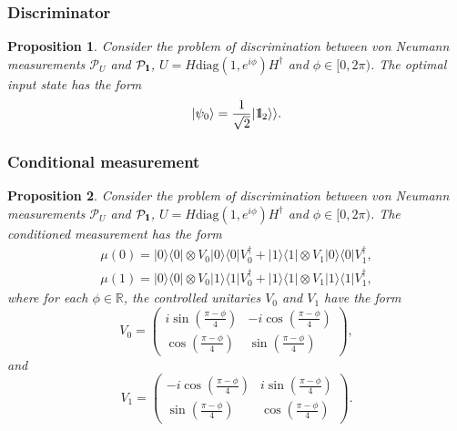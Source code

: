\documentclass[preprint,12pt, a4paper]{elsarticle}
\newcommand{\ket}[1]{\ensuremath{|#1\rangle}}
\newcommand{\bra}[1]{\ensuremath{\langle#1|}}
\newcommand{\ketbra}[2]{\ensuremath{\ket{#1}\bra{#2}}}
\newcommand{\proj}[1]{\ensuremath{\ketbra{#1}{#1}}}
\newcommand{\1}{{\rm 1\hspace{-0.9mm}l}}
\newcommand{\Id}{{\rm 1\hspace{-0.9mm}l}}
\newcommand{\PP}{\mathcal{P}}
\newcommand{\diag}{\mathrm{diag}}
\newtheorem{proposition}{Proposition}
\begin{document}
\subsubsection{Discriminator}\label{sec:example_discriminator}

\begin{proposition}\label{prop-discrim}
Consider the problem of discrimination between von Neumann measurements $\PP_U$ 
and $\PP_\1$, $U = H\diag(1, e^{i \phi}) H^\dagger $ and $\phi \in [0, 
2\pi)$.  The optimal input state has the form
\begin{equation}
\ket{\psi_{0}} = \frac{1}{\sqrt{2}} |\Id_2 \rangle \rangle.
\end{equation}
\end{proposition}



\subsubsection{Conditional measurement}\label{sec_example_final_measurement}


\begin{proposition}\label{prop:optimal-measurement}
	Consider the problem of discrimination between von Neumann measurements $\PP_U$ 
	and $\PP_\1$, $U = H\diag(1, e^{i \phi}) H^\dagger $ and $\phi \in [0, 
	2\pi)$.  
The  conditioned measurement has the form
\begin{equation}
\begin{split}
\mu(0) = \proj{0} \otimes V_0 \proj{0} V_0^\dagger +  \proj{1} \otimes V_1 
\proj{0} V_1^\dagger,  \\ 
\mu(1) = \proj{0} \otimes V_0 \proj{1} V_0^\dagger +  \proj{1} \otimes V_1 
\proj{1} V_1^\dagger,
\end{split}
\end{equation}
where for each $\phi \in \mathbb{R}$,  the controlled unitaries $V_0$ and $V_1$ 
have the form
\begin{equation}
V_0 = \left(\begin{array}{cc}i \sin\left( \frac{\pi - \phi}{4} \right)&-i 
\cos\left( \frac{\pi - \phi}{4} \right)\\ \cos\left( \frac{\pi - 
\phi}{4}\right)& \sin\left( \frac{\pi - \phi}{4} \right)\end{array}\right),
\end{equation}
and
\begin{equation}
V_1 = \left(\begin{array}{cc}-i \cos\left(\frac{\pi - \phi}{4}\right) &i 
\sin\left( \frac{\pi - \phi}{4}\right)\\\sin\left( \frac{\pi - \phi}{4} \right) 
&  \cos\left( \frac{\pi - \phi}{4} \right) \end{array}\right).
\end{equation}
\end{proposition}
\end{document}
